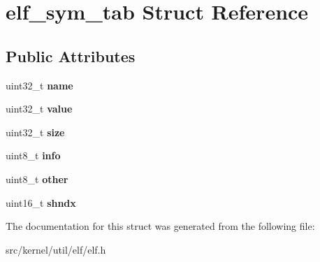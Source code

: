\hypertarget{structelf__sym__tab}{}\section{elf\+\_\+sym\+\_\+tab Struct Reference}
\label{structelf__sym__tab}
\subsection*{Public Attributes}
\begin{DoxyCompactItemize}
\item 
\mbox{\label{structelf__sym__tab_af84b5bf7f42cb4be392c71249579b8c8}} 
uint32\+\_\+t {\bfseries name}
\item 
\mbox{\label{structelf__sym__tab_af09ed9ed110707b9cb291bf72151fea9}} 
uint32\+\_\+t {\bfseries value}
\item 
\mbox{\label{structelf__sym__tab_a5a4deedff72e5f330032746455812ab1}} 
uint32\+\_\+t {\bfseries size}
\item 
\mbox{\label{structelf__sym__tab_a24643a4e794d0dbca5d408ed01f278a4}} 
uint8\+\_\+t {\bfseries info}
\item 
\mbox{\label{structelf__sym__tab_a541bb433b1099b06db914d924ec6f892}} 
uint8\+\_\+t {\bfseries other}
\item 
\mbox{\label{structelf__sym__tab_a27e25fb71f9208047316217c290f8f2c}} 
uint16\+\_\+t {\bfseries shndx}
\end{DoxyCompactItemize}


The documentation for this struct was generated from the following file\+:\begin{DoxyCompactItemize}
\item 
src/kernel/util/elf/elf.\+h\end{DoxyCompactItemize}
